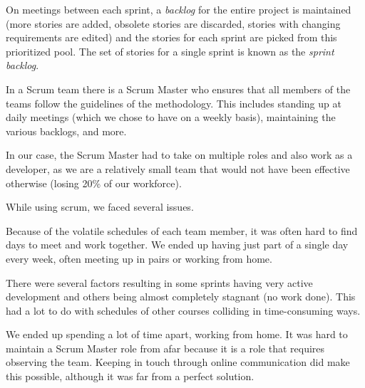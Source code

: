On meetings between each sprint, a \emph{backlog} for the entire project is maintained (more stories are
added, obsolete stories are discarded, stories with changing requirements are edited) and the stories
for each sprint are picked from this prioritized pool. The set of stories for a single sprint is known
as the \emph{sprint backlog}.

In a Scrum team there is a Scrum Master who ensures that all members of the teams follow the guidelines
of the methodology. This includes standing up at daily meetings (which we chose to have on a weekly basis),
maintaining the various backlogs, and more.

In our case, the Scrum Master had to take on multiple roles and also work as a developer, as we are a relatively
small team that would not have been effective otherwise (losing 20\% of our workforce).

While using scrum, we faced several issues.

Because of the volatile schedules of each team member, it was often hard to find days to meet and work
together. We ended up having just part of a single day every week, often meeting up in pairs or working
from home.

There were several factors resulting in some sprints having very active development and others being almost
completely stagnant (no work done). This had a lot to do with schedules of other courses colliding in
time-consuming ways.

We ended up spending a lot of time apart, working from home. It was hard to maintain a Scrum Master role from
afar because it is a role that requires observing the team. Keeping in touch through online communication did
make this possible, although it was far from a perfect solution.
